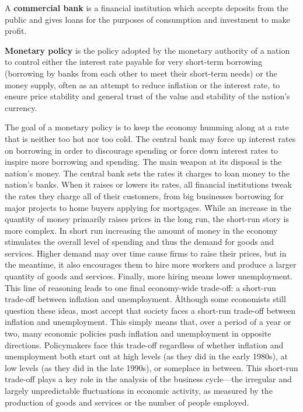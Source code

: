 A \textbf{commercial bank} is a financial institution which accepts deposits from the public and gives loans for the
purposes of consumption and investment to make profit.
\ed

\textbf{Monetary policy} is the policy adopted by the monetary authority of a nation to control either the interest
rate payable for very short-term borrowing (borrowing by banks from each other to meet their short-term needs) or the
money supply, often as an attempt to reduce inflation or the interest rate, to ensure price stability and general
trust of the value and stability of the nation's currency.
\ed

The goal of a monetary policy is to keep the economy humming along at a rate that is neither too hot nor too cold.
The central bank may force up interest rates on borrowing in order to discourage spending or force down interest
rates to inspire more borrowing and spending. The main weapon at its disposal is the nation's money. The central bank
sets the rates it charges to loan money to the nation's banks. When it raises or lowers its rates, all financial
institutions tweak the rates they charge all of their customers, from big businesses borrowing for major projects to
home buyers applying for mortgages. \v

While an increase in the quantity of money primarily raises prices in the long run, the short-run story is more
complex. In short run increasing the amount of money in the economy stimulates the overall level of spending and thus
the demand for goods and services. Higher demand may over time cause firms to raise their prices, but in the
meantime, it also encourages them to hire more workers and produce a larger quantity of goods and services. Finally,
more hiring means lower unemployment. This line of reasoning leads to one final economy-wide trade-off: a short-run
trade-off between inflation and unemployment. \v

Although some economists still question these ideas, most accept that society faces a short-run trade-off between
inflation and unemployment. This simply means that, over a period of a year or two, many economic policies push
inflation and unemployment in opposite directions. Policymakers face this trade-off regardless of whether inflation
and unemployment both start out at high levels (as they did in the early 1980s), at low levels (as they did in the
late 1990s), or someplace in between. This short-run trade-off plays a key role in the analysis of the business
cycle—the irregular and largely unpredictable fluctuations in economic activity, as measured by the production of
goods and services or the number of people employed.

